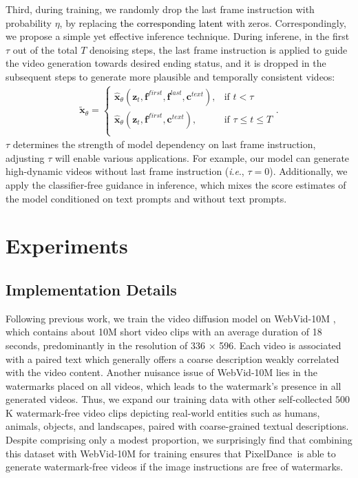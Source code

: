 \documentclass[10pt,twocolumn,letterpaper]{article}
\newcommand{\tcb}{\textcolor{black}}
\newcommand{\ieno}{\textit{i}.\textit{e}.}
\newcommand{\ours}{{PixelDance}}
\begin{document}
Third, during training, we randomly drop the last frame instruction with probability $\eta$, by replacing \tcb{the corresponding latent}
with zeros. Correspondingly, we propose a simple yet effective inference technique. During inferene, in the first $\tau$ out of the total $T$ denoising steps, the last frame instruction is applied to guide the video generation towards desired ending status, and it is dropped in the subsequent steps to generate more plausible and temporally consistent videos:
\begin{align}
\tilde{\mathbf{x}}_\theta = 
\begin{cases}
\hat{{\mathbf{x}}}_\theta( \mathbf{z}_t, \mathbf{f}^{first}, \mathbf{f}^{last}, \mathbf{c}^{text} ), & \text{if } t < \tau \\
\hat{{\mathbf{x}}}_\theta( \mathbf{z}_t, \mathbf{f}^{first}, \mathbf{c}^{text} ), & \text{if } \tau \leq t \leq T \\
\end{cases}
.
\label{eq: drop_last_frame}
\end{align}
$\tau$ determines the strength of model dependency on last frame instruction, adjusting $\tau$ will enable various applications. For example, our model can generate high-dynamic videos without last frame instruction (\ieno, $\tau=0$). 
Additionally, we apply the classifier-free guidance \cite{ho2022classifierfree} in inference, which mixes the score estimates of the model conditioned on text prompts and without text prompts.

 \section{Experiments}


\subsection{Implementation Details}
\label{sec: details}

Following previous work, we train the video diffusion model on WebVid-10M \cite{bain2021WEBVID}, which contains about 10M short video clips with an average duration of 18 seconds, predominantly in the resolution of 336 × 596. Each video is associated with a paired text which generally offers a coarse description weakly correlated with the video content. Another nuisance issue of WebVid-10M lies in the watermarks placed on all videos, which leads to the watermark's presence in all generated videos. Thus, we expand our training data with other self-collected $500$K watermark-free video clips depicting real-world entities such as humans, animals, objects, and landscapes, paired with coarse-grained textual descriptions. Despite comprising only a modest proportion, we surprisingly find that combining this dataset with WebVid-10M for training ensures that \ours~is able to generate watermark-free videos if the image instructions are free of watermarks. 
\end{document}
